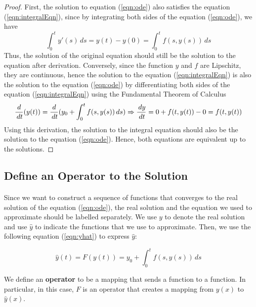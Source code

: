 \documentclass{article}
\theoremstyle{definition}
\theoremstyle{remark}
\begin{document}
\begin{proof}
    First, the solution to equation (\ref{eqn:ode}) also satisfies the equation (\ref{eqn:integralEqn}), since by integrating both sides of the equation (\ref{eqn:ode}), we have 
    \begin{equation}
        \int_{0}^{t}y'(s)\,ds = y(t) - y(0) = \int_{0}^{t} f(s,y(s)) \,ds
    \end{equation}
    Thus, the solution of the original equation should still be the solution to the equation after derivation.
    Conversely, since the function $y$ and $f$ are Lipschitz, they are continuous, hence the solution to the equation (\ref{eqn:integralEqn}) is also the solution to the equation (\ref{eqn:ode}) by differentiating both sides of the equation (\ref{eqn:integralEqn}) using the Fundamental Theorem of Calculus
    \begin{equation}
        \dfrac{d}{\,dt}{(y(t))} = \dfrac{d}{\,dt}{(y_0 + \int_{0}^{t}{f(s,y(s))\,ds})}\\
        \Rightarrow \dfrac{\,dy}{\,dt} = 0 + f(t,y(t)) - 0 = f(t,y(t))
    \end{equation}
    Using this derivation, the solution to the integral equation should also be the solution to the equation (\ref{eqn:ode}). Hence, both equations are equivalent up to the solutions.
\end{proof}

\subsection{Define an Operator to the Solution}

\paragraph{  }

Since we want to construct a sequence of functions that converges to the real solution of the equation (\ref{eqn:ode}), the real solution and the equation we used to approximate should be labelled separately. We use $y$ to denote the real solution and use $\hat{y}$ to indicate the functions that we use to approximate. Then, we use the following equation (\ref{eqn:yhat}) to express $\hat{y}$:

\begin{equation}\label{eqn:yhat}
    \hat{y}(t) = F(y(t)) = y_0 + \int_{0}^{t}{f(s,y(s))}\,ds
\end{equation}

We define an \textbf{operator} to be a mapping that sends a function to a function. In particular, in this case, $F$ is an operator that creates a mapping from $y(x)$ to $\hat{y}(x)$.
\end{document}
